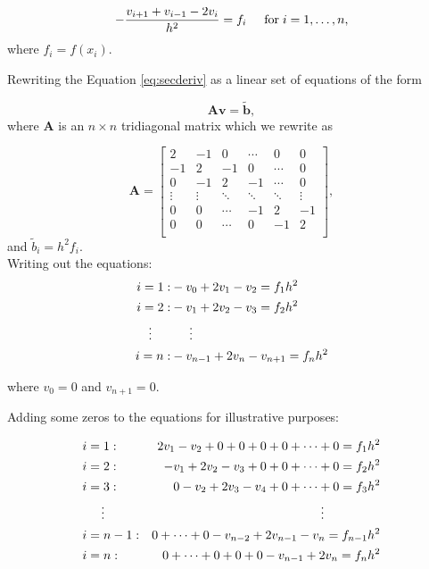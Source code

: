 
\begin{equation}\label{eq:secderiv}
   -\frac{v_{i+1}+v_{i-1}-2v_i}{h^2} = f_i  \hspace{0.5cm} \mathrm{for} \hspace{0.1cm} i=1,\dots, n,
\end{equation}
where $f_i=f(x_i)$.

Rewriting the Equation \ref{eq:secderiv} as a linear set of equations of the form

\begin{equation*}
   \mathbf{A}\mathbf{v} = \tilde{\mathbf{b}},
\end{equation*}
where $\mathbf{A}$ is an $n\times n$  tridiagonal matrix which we rewrite as

\[
    \mathbf{A} = \begin{bmatrix}
    	2& -1& 0 &\cdots & 0 &0 \\
        -1 & 2 & -1 &0 &\cdots &0 \\
        0&-1 &2 & -1 & \cdots & 0 \\
        \vdots& \vdots & \ddots &\ddots &\ddots & \vdots \\
        0&0 & \cdots &-1 &2& -1 \\
        0&0 & \cdots & 0  &-1 & 2 \\
        \end{bmatrix},
\]
and $\tilde{b}_i=h^2f_i$.\\

Writing out the equations:
\begin{align*}
i = 1: &-v_0+2v_1-v_2 = f_1 h^2\\
i = 2: &-v_1+2v_2-v_3 = f_2 h^2\\
\vdots \indent &\indent \vdots\\
i = n: &-v_{n-1}+2v_n-v_{n+1} = f_n h^2\\
\end{align*}

where $v_0 = 0$ and $v_{n+1} = 0$.

Adding some zeros to the equations for illustrative purposes:

\begin{align*}
&i = 1:  &2v_1-v_2 + 0 + 0 + 0 +0 + \cdots + 0 = f_1 h^2\\
&i = 2: &-v_1+2v_2-v_3 +0 + 0 + \cdots + 0 = f_2 h^2\\
&i = 3:  &0 -v_2+2v_3-v_4 + 0 + \cdots + 0 = f_3 h^2\\
&\indent\vdots \indent &\vdots \indent \indent \indent \\
&i = n-1: &0 + \cdots+ 0 -v_{n-2}+2v_{n-1} - v_n= f_{n-1} h^2\\
&i = n: &0 + \cdots + 0 + 0 + 0 -v_{n-1}+2v_n= f_n h^2\\
\end{align*}

